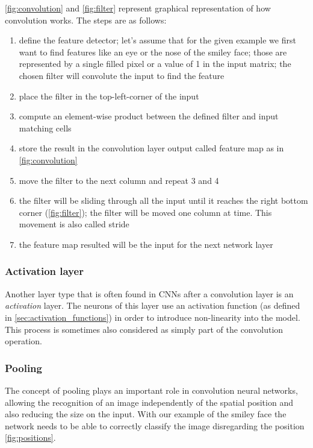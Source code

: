 \par
\cref{fig:convolution} and \cref{fig:filter} represent graphical representation of how convolution works. The steps are as follows:
\begin{enumerate}
    \item define the feature detector; let's assume that for the given example we first want to find features like an eye or the nose of the smiley face; those are represented by a single filled pixel or a value of 1 in the input matrix; the chosen filter will convolute the input to find the feature
    \item place the filter in the top-left-corner of the input
    \item compute an element-wise product between the defined filter and input matching cells
    \item store the result in the convolution layer output called feature  map as in \cref{fig:convolution}
    \item move the filter to the next column and repeat 3 and 4
    \item the filter will be sliding through all the input until it reaches the right bottom corner (\cref{fig:filter}); the filter will be moved one column at time. This movement is also called stride
    \item the feature map resulted will be the input for the next network layer
\end{enumerate}

\subsubsection{Activation layer}
\par
Another layer type that is often found in CNNs after a convolution layer is an \textit{activation} layer. The neurons of this layer use an activation function (as defined in \cref{sec:activation_functions}) in order to introduce non-linearity into the model. This process is sometimes also considered as simply part of the convolution operation.

\subsubsection{Pooling}
\label{sec:pooling layer}
\par 
The concept of pooling plays an important role in convolution neural networks, allowing the recognition of an image independently of the spatial position and also reducing the size on the input.
With our example of the smiley face the network needs to be able to correctly classify the image disregarding the position \cref{fig:positions}.

